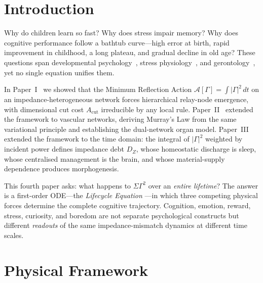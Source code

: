 ﻿\documentclass[aps,pre,twocolumn,superscriptaddress,floatfix]{revtex4-2}
\begin{document}
\maketitle


\section{Introduction}
\label{sec:intro}

Why do children learn so fast?
Why does stress impair memory?
Why does cognitive performance follow a
bathtub curve---high error at birth, rapid improvement
in childhood, a long plateau, and gradual decline in old age?
These questions span developmental psychology~\cite{Kail1991},
stress physiology~\cite{McEwen1998},
and gerontology~\cite{Salthouse2010},
yet no single equation unifies them.

In Paper~I~\cite{PaperI} we showed that the Minimum
Reflection Action $\mathcal{A}[\Gamma] = \int |\Gamma|^2\,dt$
on an impedance-heterogeneous network forces hierarchical
relay-node emergence, with dimensional cut cost $A_{\mathrm{cut}}$
irreducible by any local rule.
Paper~II~\cite{PaperII} extended the framework to vascular
networks, deriving Murray's Law from the same variational
principle and establishing the dual-network organ model.
Paper~III~\cite{PaperIII} extended the framework to the time domain:
the integral of $|\Gamma|^2$ weighted by incident power
defines impedance debt $D_Z$, whose homeostatic discharge
is sleep, whose centralised management is the brain,
and whose material-supply dependence produces morphogenesis.

This fourth paper asks: what happens to $\Sigma\Gamma^2$
over an \emph{entire lifetime}?
The answer is a first-order ODE---the \emph{Lifecycle Equation}
---in which three competing physical forces determine the
complete cognitive trajectory.
Cognition, emotion, reward, stress, curiosity, and boredom
are not separate psychological constructs but different
\emph{readouts} of the same impedance-mismatch dynamics
at different time scales.


\section{Physical Framework}
\label{sec:framework}
\end{document}
